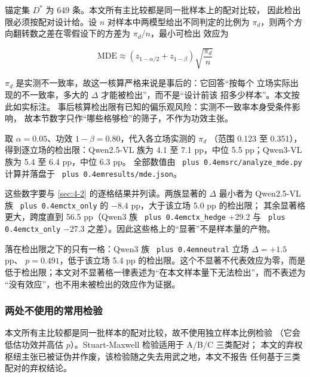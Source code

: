 \documentclass[10.5pt,compsoc,UTF8]{CjC}
\theoremstyle{mystyle}
\DeclareRobustCommand{\code}[1]{\texttt{\spaceskip=0pt plus 0.4em\relax#1}}
\DeclareRobustCommand{\codesplit}[1]{\texttt{\spaceskip=0pt plus 0.4em\relax#1}}
\begin{document}
锚定集 $D^*$ 为 649 条。本文所有主比较都是同一批样本上的配对比较，
因此检出限必须按配对设计给。设 $n$ 对样本中两模型给出不同判定的比例为
$\pi_d$，则两个方向翻转数之差在零假设下的方差为 $\pi_d / n$，最小可检出
效应为

\begin{equation}
  \text{MDE} \approx (z_{1-\alpha/2} + z_{1-\beta})\sqrt{\frac{\pi_d}{n}}
\end{equation}

$\pi_d$ 是实测不一致率，故这一核算严格来说是事后的：它回答“按每个
立场实际出现的不一致率，多大的 $\Delta$ 才能被检出”，而不是“设计前该
招多少样本”。本文按此如实标注。
事后核算检出限有已知的偏乐观风险\cite{ref28}：实测不一致率本身受条件影响，
故本节数字只作“哪些格够检”的筛子，不作为功效主张。

取 $\alpha = 0.05$、功效 $1-\beta = 0.80$，代入各立场实测的 $\pi_d$
（范围 0.123 至 0.351），得到逐立场的检出限：Qwen2.5-VL 族为 4.1 至
7.1 pp，中位 5.5 pp；Qwen3-VL 族为 5.4 至 6.4 pp，中位 6.3 pp。
全部数值由 \codesplit{s\allowbreak{}r\allowbreak{}c\allowbreak{}/\allowbreak{}a\allowbreak{}n\allowbreak{}a\allowbreak{}l\allowbreak{}y\allowbreak{}z\allowbreak{}e\allowbreak{}\_m\allowbreak{}d\allowbreak{}e\allowbreak{}.\allowbreak{}p\allowbreak{}y\allowbreak{}} 计算并落盘于 \codesplit{r\allowbreak{}e\allowbreak{}s\allowbreak{}u\allowbreak{}l\allowbreak{}t\allowbreak{}s\allowbreak{}/\allowbreak{}m\allowbreak{}d\allowbreak{}e\allowbreak{}.\allowbreak{}j\allowbreak{}s\allowbreak{}o\allowbreak{}n\allowbreak{}}。

这些数字要与 \ref{sec:4-2} 的逐格结果并列读。两族显著的 $\Delta$ 最小者为
Qwen2.5-VL 族 \code{ctx\_only} 的 $-8.4$ pp，大于该立场 5.0 pp 的检出限；
其余显著格更大，跨度直到 56.5 pp（Qwen3 族 \code{ctx\_hedge} $+29.2$ 与
\code{ctx\_only} $-27.3$ 之差）。因此这些格上的“显著”不是样本量的产物。

落在检出限之下的只有一格：Qwen3 族 \code{neutral} 立场 $\Delta = +1.5$ pp、
$p = 0.491$，低于该立场 5.4 pp 的检出限。这个不显著不代表效应为零，而是
低于检出限；本文对不显著格一律表述为“在本文样本量下无法检出”，而不表述为
“没有效应”，也不用未被检出的效应作为证据。

\subsubsection{两处不使用的常用检验}
\label{sec:4-5-5}

本文所有主比较都是同一批样本的配对比较，故不使用独立样本比例检验
（它会低估功效并高估 $p$）。Stuart-Maxwell 检验适用于 A/B/C 三类配对；
本文的弃权枢纽主张已被证伪并作废，该检验随之失去用武之地，本文不报告
任何基于三类配对的弃权结论。
\end{document}
